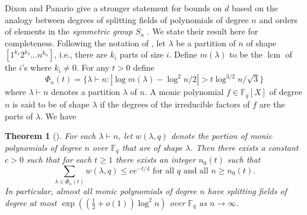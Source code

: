 \documentclass{article}
\theoremstyle{plain}
\newtheorem{theorem}{Theorem}
\theoremstyle{definition}
\newcommand{\abs}[1]{\left\vert#1\right\vert}
\DeclareMathOperator{\lcm}{lcm} %
\def\F{\ensuremath{\mathbb{F}}}
\begin{document}
Dixon and Panario \cite{dixon2004degree} give a stronger statement for bounds on $d$ based on the 
analogy between degrees of splitting fields of polynomials of degree $n$ and orders of elements in 
the \textit{symmetric group} $S_n$ \cite{erdos1965some, erdos1967some}. We state their result here 
for completeness. Following the notation of \cite{dixon2004degree}, let $\lambda$ be a partition of 
$n$ of shape $[1^{k_1} 2^{k_2} \dots n^{k_n}]$, i.e., there are $k_i$ parts of size $i$. Define 
$m(\lambda)$ to be the $\lcm$ of the $i$'s where $k_i \ne 0$. For any $t > 0$ define 
\[ \Phi_n(t) = \{ \lambda \vdash n : \abs{\log m(\lambda) - \log^2n / 2} > t\log^{3/2}n / \sqrt{3} 
\} \]
where $\lambda \vdash n$ denotes a partition $\lambda$ of $n$. A monic polynomial $f \in \F_q[X]$ 
of degree $n$ is said to be of shape $\lambda$ if the degrees of the irreducible factors of $f$ are 
the parts of $\lambda$. We have
\begin{theorem}[{\cite[Theorem 1]{dixon2004degree}}]
\label{thm:split-order}
	For each $\lambda \vdash n$, let $w(\lambda, q)$ denote the portion of monic polynomials of 
	degree $n$ over $\F_q$ that are of shape $\lambda$. Then there exists a constant $c > 0$ 
	such that for each $t \ge 1$ there exists an integer $n_0(t)$ such that 
	\[ \sum_{\lambda \in \Phi_n(t)} w(\lambda, q) \le ce^{-t / 4} \text{ for all } q \text{ and all 
	} n \ge n_0(t). \]
	In particular, almost all monic polynomials of degree $n$ have splitting fields of degree at 
	most $\exp((\frac{1}{2} + o(1))\log^2n)$ over $\F_q$ as $n \to \infty$.
\end{theorem}
\end{document}
